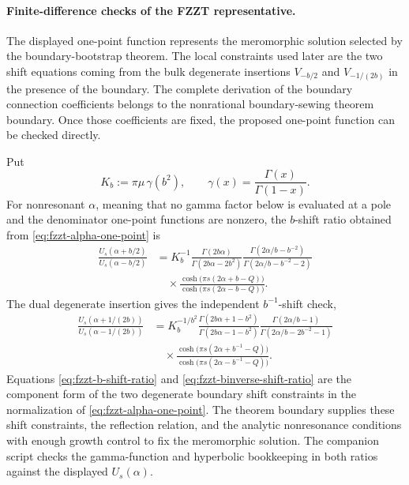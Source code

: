 \paragraph{Finite-difference checks of the FZZT representative.}
The displayed one-point function represents the meromorphic solution selected
by the boundary-bootstrap theorem.  The local constraints used later are the
two shift equations coming from the bulk degenerate insertions \(V_{-b/2}\)
and \(V_{-1/(2b)}\) in the presence of the boundary.  The complete derivation
of the boundary connection coefficients belongs to the nonrational
boundary-sewing theorem boundary.  Once those coefficients are fixed, the
proposed one-point function can be checked directly.

Put
\[
  K_b:=\pi\mu\,\gamma(b^2),
  \qquad
  \gamma(x)=\frac{\Gamma(x)}{\Gamma(1-x)}.
\]
For nonresonant \(\alpha\), meaning that no gamma factor below is evaluated at
a pole and the denominator one-point functions are nonzero, the
\(b\)-shift ratio obtained from \eqref{eq:fzzt-alpha-one-point} is
\begin{equation}
\begin{aligned}
  \frac{U_s(\alpha+b/2)}{U_s(\alpha-b/2)}
  &=
  K_b^{-1}
  \frac{\Gamma(2b\alpha)}
       {\Gamma(2b\alpha-2b^2)}
  \frac{\Gamma(2\alpha/b-b^{-2})}
       {\Gamma(2\alpha/b-b^{-2}-2)}
  \\
  &\quad\times
  \frac{\cosh\!\bigl(\pi s(2\alpha+b-Q)\bigr)}
       {\cosh\!\bigl(\pi s(2\alpha-b-Q)\bigr)} .
\end{aligned}
  \label{eq:fzzt-b-shift-ratio}
\end{equation}
The dual degenerate insertion gives the independent \(b^{-1}\)-shift check,
\begin{equation}
\begin{aligned}
  \frac{U_s(\alpha+1/(2b))}{U_s(\alpha-1/(2b))}
  &=
  K_b^{-1/b^2}
  \frac{\Gamma(2b\alpha+1-b^2)}
       {\Gamma(2b\alpha-1-b^2)}
  \frac{\Gamma(2\alpha/b-1)}
       {\Gamma(2\alpha/b-2b^{-2}-1)}
  \\
  &\quad\times
  \frac{\cosh\!\bigl(\pi s(2\alpha+b^{-1}-Q)\bigr)}
       {\cosh\!\bigl(\pi s(2\alpha-b^{-1}-Q)\bigr)} .
\end{aligned}
  \label{eq:fzzt-binverse-shift-ratio}
\end{equation}
Equations \eqref{eq:fzzt-b-shift-ratio} and
\eqref{eq:fzzt-binverse-shift-ratio} are the component form of the two
degenerate boundary shift constraints in the normalization of
\eqref{eq:fzzt-alpha-one-point}.  The theorem boundary supplies these shift
constraints, the reflection relation, and the analytic nonresonance
conditions with enough growth control to fix the meromorphic solution.  The
companion script checks the gamma-function and hyperbolic bookkeeping in both
ratios against the displayed \(U_s(\alpha)\).

